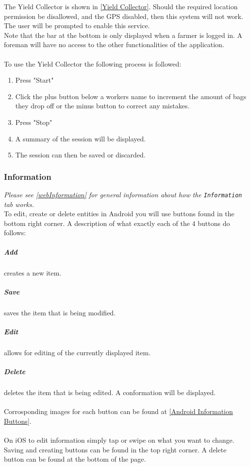 \documentclass[11pt]{article}
\begin{document}
The Yield Collector is shown in \ref{Yield Collector}. Should the required location permission be disallowed, and the GPS disabled, then this system will not work. The user will be prompted to enable this service.\\
Note that the bar at the bottom is only displayed when a farmer is logged in. A foreman will have no access to the other functionalities of the application.\\
\\
To use the Yield Collector the following process is followed:
\begin{enumerate}
\item Press "Start"
\item Click the plus button below a workers name to increment the amount of bags they drop off or the minus button to correct any mistakes.
\item Press "Stop"
\item A summary of the session will be displayed.
\item The session can then be saved or discarded.
\end{enumerate}

\subsubsection{Information}
\label{Mobile Information}
\textit{Please see \ref{webInformation} for general information about how the \texttt{Information} tab works.}\\

To edit, create or delete entities in Android you will use buttons found in the bottom right corner. A description of what exactly each of the 4
buttons do follows:
\subparagraph{Add} creates a new item.
\subparagraph{Save} saves the item that is being modified.
\subparagraph{Edit} allows for editing of the currently displayed item.
\subparagraph{Delete} deletes the item that is being edited. A conformation will be displayed.\\
\\
Corrosponding images for each button can be found at \ref{Android Information Buttons}.\\
\\
On iOS to edit information simply tap or swipe on what you want to change. Saving and creating buttons can be found in the top right corner.
A delete button can be found at the bottom of the page.
\end{document}
